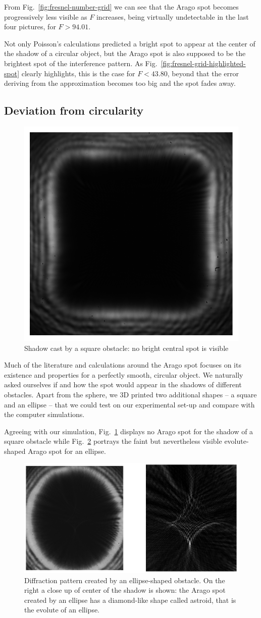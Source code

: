 \documentclass[11pt,a4paper]{article}
\begin{document}
From Fig.~\ref{fig:fresnel-number-grid} we can see that the Arago spot becomes progressively less visible as \(F\) increases, being virtually undetectable in the last four pictures, for \(F > 94.01\).

Not only Poisson's calculations predicted a bright spot to appear at the center of the shadow of a circular object, but the Arago spot is also supposed to be the brightest spot of the interference pattern. As Fig.~\ref{fig:fresnel-grid-highlighted-spot} clearly highlights, this is the case for \(F < 43.80\), beyond that the error deriving from the approximation becomes too big and the spot fades away.

\subsection{Deviation from circularity}

\begin{figure}[H]
    \centering
    \includegraphics[width=0.3\linewidth]{images/square.pdf}
    \caption{Shadow cast by a square obstacle: no bright central spot is visible}
    \label{fig:square}    
\end{figure}

Much of the literature and calculations around the Arago spot focuses on its existence and properties for a perfectly smooth, circular object. We naturally asked ourselves if and how the spot would appear in the shadows of different obstacles. Apart from the sphere, we 3D printed two additional shapes -- a square and an ellipse -- that we could test on our experimental set-up and compare with the computer simulations.

Agreeing with our simulation, Fig.~\ref{fig:square} displays no Arago spot for the shadow of a square obstacle while Fig.~\ref{fig:ellipse} portrays the faint but nevertheless visible evolute-shaped Arago spot for an ellipse.

\begin{figure}[H]
    \centering
    \includegraphics[width=0.6\linewidth]{images/ellipse.pdf}
    \caption{Diffraction pattern created by an ellipse-shaped obstacle. On the right a close up of center of the shadow is shown: the Arago spot created by an ellipse has a diamond-like shape called astroid, that is the evolute of an ellipse.}
    \label{fig:ellipse}
\end{figure}
\end{document}
